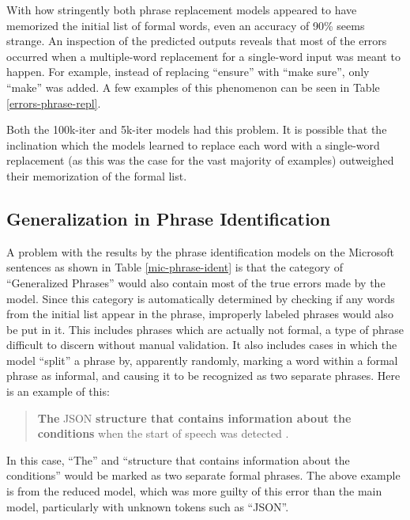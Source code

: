 With how stringently both phrase replacement models appeared to have memorized the initial list of formal words, even an accuracy of 90\% seems strange. An inspection of the predicted outputs reveals that most of the errors occurred when a multiple-word replacement for a single-word input was meant to happen. For example, instead of replacing ``ensure'' with ``make sure'', only ``make'' was added. A few examples of this phenomenon can be seen in Table \ref{errors-phrase-repl}.

Both the 100k-iter and 5k-iter models had this problem. It is possible that the inclination which the models learned to replace each word with a single-word replacement (as this was the case for the vast majority of examples) outweighed their memorization of the formal list.

\subsection{Generalization in Phrase Identification}

A problem with the results by the phrase identification models on the Microsoft sentences as shown in Table \ref{mic-phrase-ident} is that the category of ``Generalized Phrases'' would also contain most of the true errors made by the model. Since this category is automatically determined by checking if any words from the initial list appear in the phrase, improperly labeled phrases would also be put in it. This includes phrases which are actually not formal, a type of phrase difficult to discern without manual validation. It also includes cases in which the model ``split'' a phrase by, apparently randomly, marking a word within a formal phrase as informal, and causing it to be recognized as two separate phrases. Here is an example of this:

\begin{quote}
\textbf{The} JSON \textbf{structure that contains information about the conditions} when the start of speech was detected .
\end{quote}

In this case, ``The'' and ``structure that contains information about the conditions'' would be marked as two separate formal phrases. The above example is from the reduced model, which was more guilty of this error than the main model, particularly with unknown tokens such as ``JSON''.

